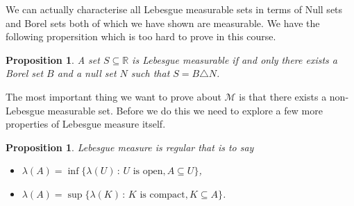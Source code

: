 \documentclass[11pt]{article}
\newtheorem{prp}[thm]{Proposition}
\theoremstyle{definition}
\theoremstyle{remark}
\begin{document}
We can actually characterise all Lebesgue measurable sets in terms of Null sets and Borel sets both of which we have shown are measurable. We have the following propersition which is too hard to prove in this course.
\begin{prp}
A set $S \subseteq \mathbb{R}$ is Lebesgue measurable if and only there exists a Borel set $B$ and a null set $N$ such that $S = B \triangle N$.
\end{prp}
The most important thing we want to prove about $\mathscr{M}$ is that there exists a non-Lebesgue measurable set. Before we do this we need to explore a few more properties of Lebesgue measure itself.

\begin{prp}
Lebesgue measure is \emph{regular} that is to say
\begin{itemize}
\item $\lambda(A) = \inf \{ \lambda(U)\,:\, \mbox{$U$ is open}, A \subseteq U\}$,
\item $\lambda(A) = \sup \{ \lambda(K)\,:\, \mbox{$K$ is compact}, K \subseteq A\}$.
\end{itemize}
\end{prp}
\end{document}
